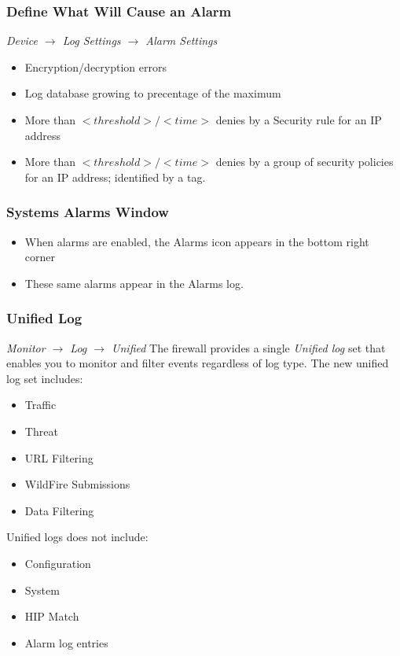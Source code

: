 \subsubsection{Define What Will Cause an Alarm}
\textit{Device $\rightarrow$ Log Settings $\rightarrow$ Alarm Settings}
\begin{itemize}
    \item Encryption/decryption errors
    \item Log database growing to precentage of the maximum
    \item More than $<threshold>/<time>$ denies by a Security rule for an IP address
    \item More than $<threshold>/<time>$ denies by a group of security policies for an IP address; identified by a tag.
\end{itemize}

\subsubsection{Systems Alarms Window}
\begin{itemize}
    \item When alarms are enabled, the Alarms icon appears in the bottom right corner
    \item These same alarms appear in the Alarms log.
\end{itemize}

\subsubsection{Unified Log}
\textit{Monitor $\rightarrow$ Log $\rightarrow$ Unified}
\newline
The firewall provides a single \textit{Unified log} set that enables you to monitor and filter events regardless of log type.
The new unified log set includes:
\begin{itemize}
    \item Traffic
    \item Threat
    \item URL Filtering
    \item WildFire Submissions
    \item Data Filtering
\end{itemize}

Unified logs does not include:
\begin{itemize}
    \item Configuration
    \item System
    \item HIP Match
    \item Alarm log entries
\end{itemize}


